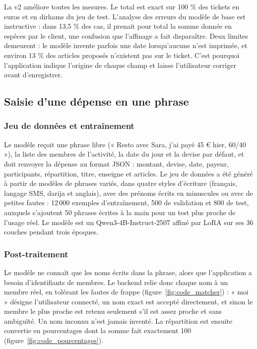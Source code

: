 La v2 améliore toutes les mesures. Le total est exact sur 100 \% des tickets en euros et en
dirhams du jeu de test. L'analyse des erreurs du modèle de base est instructive : dans
13,5 \% des cas, il prenait pour total la somme donnée en espèces par le client, une
confusion que l'affinage a fait disparaître. Deux limites demeurent : le modèle invente
parfois une date lorsqu'aucune n'est imprimée, et environ 13 \% des articles proposés
n'existent pas sur le ticket. C'est pourquoi l'application indique l'origine de chaque champ
et laisse l'utilisateur corriger avant d'enregistrer.

\subsection{Saisie d'une dépense en une phrase}

\subsubsection{Jeu de données et entraînement}

Le modèle reçoit une phrase libre (« Resto avec Sara, j'ai payé 45 € hier, 60/40 »), la
liste des membres de l'activité, la date du jour et la devise par défaut, et doit renvoyer
la dépense au format JSON : montant, devise, date, payeur, participants, répartition,
titre, enseigne et articles. Le jeu de données a été généré à partir de modèles de phrases
variés, dans quatre styles d'écriture (français, langage SMS, darija et anglais), avec
des prénoms écrits en minuscules ou avec de petites fautes : 12\,000 exemples
d'entraînement, 500 de validation et 800 de test, auxquels s'ajoutent 50 phrases écrites à
la main pour un test plus proche de l'usage réel. Le modèle est un Qwen3-4B-Instruct-2507
affiné par LoRA sur ses 36 couches pendant trois époques.

\subsubsection{Post-traitement}

Le modèle ne connaît que les noms écrits dans la phrase, alors que l'application a besoin
d'identifiants de membres. Le backend relie donc chaque nom à un membre réel, en tolérant
les fautes de frappe (figure~\ref{fig:code_matcher}) : « moi » désigne l'utilisateur
connecté, un nom exact est accepté directement, et sinon le membre le plus proche est
retenu seulement s'il est assez proche et sans ambiguïté. Un nom inconnu n'est jamais
inventé. La répartition est ensuite convertie en pourcentages dont la somme fait exactement
100 (figure~\ref{fig:code_pourcentages}).

